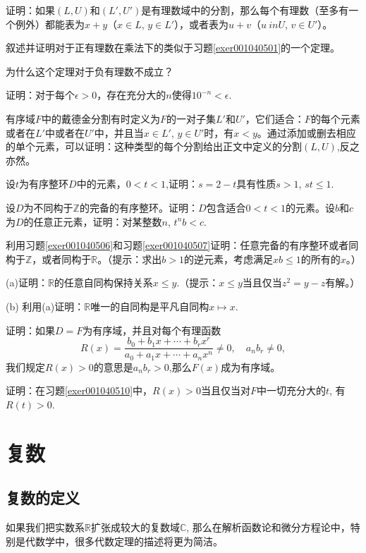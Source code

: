 \begin{problemset}
\item\label{exer001040501} 证明：如果$(L,U)$和$(L',U')$是有理数域中的分割，那么每个有理数（至多有一个例外）都能表为$x+y$（$x \in L$, $y \in L'$），或者表为$u+v$（$u \ in U$, $v \in U'$）。

\item 叙述并证明对于正有理数在乘法下的类似于习题\ref{exer001040501}的一个定理。 

\item 为什么这个定理对于负有理数不成立？

\item 证明：对于每个$\epsilon>0$，存在充分大的$n$使得$10^{-n}<\epsilon$.

\item 有序域$F$中的戴德金分割有时定义为$F$的一对子集$L'$和$U'$，它们适合：$F$的每个元素或者在$L'$中或者在$U'$中，并且当$x \in L'$, $y \in U'$时，有$x < y$。通过添加或删去相应的单个元素，可以证明：这种类型的每个分割给出正文中定义的分割$(L, U)$,反之亦然。

\item\label{exer001040506} 设$t$为有序整环$D$中的元素，$0<t<1$,证明：$s=2-t$具有性质$s>1$, $st \le 1$.

\item\label{exer001040507} 设$D$为不同构于$\mathbb{Z}$的完备的有序整环。证明：$D$包含适合$0<t<1$的元素。设$b$和$c$为$D$的任意正元素，证明：对某整数$n$, $t^nb<c$.

\item 利用习题\ref{exer001040506}和习题\ref{exer001040507}证明：任意完备的有序整环或者同构于$\mathbb{Z}$，或者同构于$\mathbb{R}$。（提示：求出$b>1$的逆元素，考虑满足$xb \le 1$的所有的$x$。）

\item (a)证明：$\mathbb{R}$的任意自同构保持关系$x \le y$.（提示：$x \le y$当且仅当$z^2 = y-z$有解。）

(b) 利用(a)证明：$\mathbb{R}$唯一的自同构是平凡自同构$x \mapsto x$.

\item\label{exer001040510} 证明：如果$D=F$为有序域，并且对每个有理函数
\[
R(x) = \frac{b_0+b_1x + \cdots + b_rx^r}{a_0 + a_1x+\cdots+a_nx^n} \neq 0, \quad a_nb_r \neq 0,
\]
我们规定$R(x)>0$的意思是$a_nb_r>0$,那么$F(x)$成为有序域。

\item 证明：在习题\ref{exer001040510}中，$R(x)>0$当且仅当对$F$中一切充分大的$t$, 有$R(t)>0$.
\end{problemset}



\chapter{复数}\label{chapter00105}

\section{复数的定义}\label{section0010501}
如果我们把实数系$\mathbb{R}$扩张成较大的复数域$\mathbb{C}$, 那么在解析函数论和微分方程论中，特别是代数学中，很多代数定理的描述将更为简洁。




















